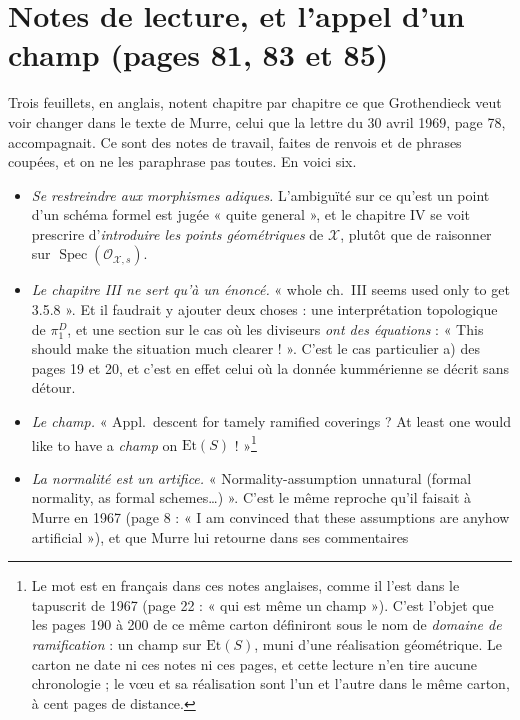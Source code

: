 \documentclass[11pt,a4paper]{article}
\begin{document}
\section*{Notes de lecture, et l'appel d'un champ (pages 81, 83 et 85)}

Trois feuillets, en anglais, notent chapitre par chapitre ce que Grothendieck
veut voir changer dans le texte de Murre, celui que la lettre du 30 avril
1969, page 78, accompagnait. Ce sont des notes de travail, faites de renvois et
de phrases coupées, et on ne les paraphrase pas toutes. En voici six.

\begin{itemize}
  \item \emph{Se restreindre aux morphismes adiques.} L'ambiguïté sur ce qu'est
    un point d'un schéma formel est jugée « quite general », et le chapitre
    IV se voit prescrire d'\emph{introduire les points géométriques} de
    $\mathcal{X}$, plutôt que de raisonner sur
    $\operatorname{Spec}(\mathcal{O}_{\mathcal{X},s})$.
  \item \emph{Le chapitre III ne sert qu'à un énoncé.} « whole ch.\ III seems
    used only to get 3.5.8 ». Et il faudrait y ajouter deux choses : une
    interprétation topologique de $\pi_{1}^{D}$, et une section sur le cas où
    les diviseurs \emph{ont des équations} : « This should make the situation
    much clearer ! ». C'est le cas particulier a) des pages 19 et 20, et c'est en effet
    celui où la donnée kummérienne se décrit sans détour.
  \item \emph{Le champ.} « Appl.\ descent for tamely ramified coverings ? At
    least one would like to have a \emph{champ} on
    $\mathrm{Et}(S)$ ! »\footnote{Le mot est en français dans ces notes
    anglaises, comme il l'est dans le tapuscrit de 1967 (page 22 : « qui est
    même un champ »). C'est l'objet que les pages 190 à 200 de ce
    même carton définiront sous le nom de \emph{domaine de ramification} : un
    champ sur $\mathrm{Et}(S)$, muni d'une réalisation géométrique. Le carton
    ne date ni ces notes ni ces pages, et cette lecture n'en tire aucune
    chronologie ; le vœu et sa réalisation sont l'un et l'autre dans le même
    carton, à cent pages de distance.}
  \item \emph{La normalité est un artifice.} « Normality-assumption unnatural
    (formal normality, as formal schemes…) ». C'est le même reproche qu'il
    faisait à Murre en 1967 (page 8 : « I am convinced that these assumptions
    are anyhow artificial »), et que Murre lui retourne dans ses commentaires

\end{itemize}
\end{document}
